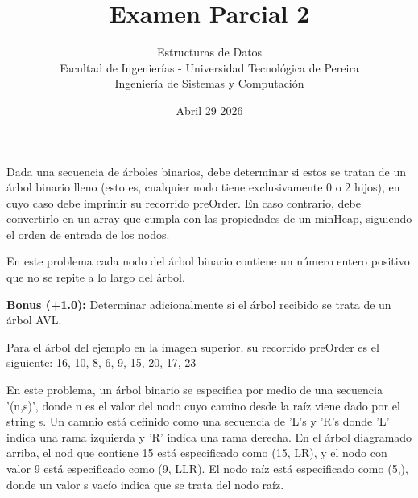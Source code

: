 \documentclass{article}
\title{Examen Parcial 2}
\author{Estructuras de Datos \\ Facultad de Ingenierías - Universidad Tecnológica de Pereira \\ Ingeniería de Sistemas y Computación}
\date{Abril 29 2026}
\begin{document}
\maketitle
\thispagestyle{empty}

Dada una secuencia de árboles binarios, debe determinar si estos se tratan de un árbol binario lleno (esto es, cualquier nodo tiene exclusivamente 0 o 2 hijos), en cuyo caso debe imprimir su recorrido preOrder. En caso contrario, debe convertirlo en un array que cumpla con las propiedades de un minHeap, siguiendo el orden de entrada de los nodos.

En este problema cada nodo del árbol binario contiene un número entero positivo que no se repite a lo largo del árbol.

\textbf{Bonus (+1.0):} Determinar adicionalmente si el árbol recibido se trata de un árbol AVL.

\vspace{0.5cm}


\vspace{0.5cm}

Para el árbol del ejemplo en la imagen superior, su recorrido preOrder es el siguiente: 16, 10, 8, 6, 9, 15, 20, 17, 23

En este problema, un árbol binario se especifica por medio de una secuencia '(n,s)', donde n es el valor del nodo cuyo camino desde la raíz viene dado por el string s. Un camnio está definido como una secuencia de 'L's y 'R's donde 'L' indica una rama izquierda y 'R' indica una rama derecha. En el árbol diagramado arriba, el nod que contiene 15 está especificado como (15, LR), y el nodo con valor 9 está especificado como (9, LLR). El nodo raíz está especificado como (5,), donde un valor s vacío indica que se trata del nodo raíz.

\vspace{0.5cm}
\end{document}
